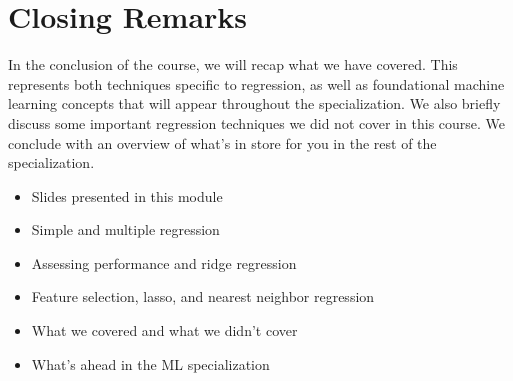 \section{Closing Remarks}
In the conclusion of the course, we will recap what we have covered. This represents both techniques specific to regression, as well as foundational machine learning concepts that will appear throughout the specialization. We also briefly discuss some important regression techniques we did not cover in this course.
We conclude with an overview of what's in store for you in the rest of the specialization.

\begin{itemize}
\item Slides presented in this module
\item Simple and multiple regression
\item Assessing performance and ridge regression
\item Feature selection, lasso, and nearest neighbor regression
\item What we covered and what we didn't cover
\item What's ahead in the ML specialization
\end{itemize}

